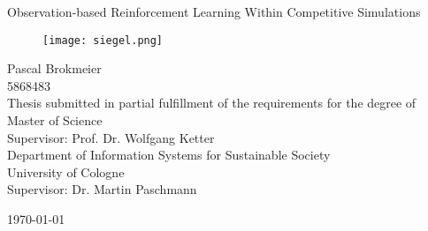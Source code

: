 \begin{titlepage}
\setlength{\parindent}{0pt} %
\begin{center}

\Huge{Observation-based Reinforcement Learning Within Competitive Simulations}

\vspace{10mm}
\begin{figure}[!h]
    \centering
    \texttt{[image: siegel.png]}
\end{figure}

\vspace{10mm}

\small{
Pascal Brokmeier \\ 5868483 \\
}
\vspace{10mm}
\small{Thesis submitted in partial fulfillment of the requirements for the degree of Master of Science\\}
\vspace{10mm}
\small{Supervisor: Prof. Dr. Wolfgang Ketter \\
Department of Information Systems for Sustainable Society \\
University of Cologne\\
Supervisor: Dr. Martin Paschmann }

\vspace{10mm}
\today
{}
\end{center}
\end{titlepage}

